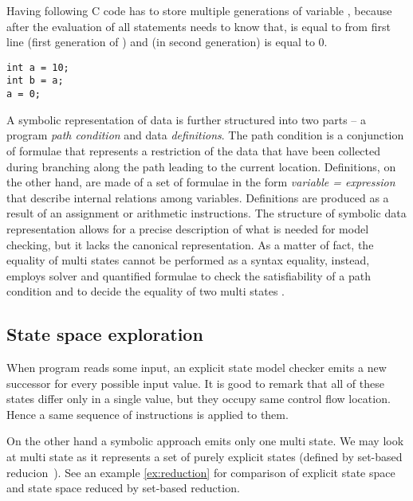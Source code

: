 
\begin{example}\label{ex:gen}
Having following C code \SymDIVINE has to store multiple generations of variable
, because after the evaluation of all statements \SymDIVINE needs to know
that,  is equal to  from first line (first generation of
) and  (in second generation) is equal to $0$.

\begin{verbatim}
int a = 10;
int b = a;
a = 0;
\end{verbatim}

\end{example}

A symbolic representation of data is further structured into two parts -- a
program \emph{path condition} and data \emph{definitions}. The path condition is a
conjunction of formulae that represents a restriction of the data that have been
collected during branching along the path leading to the current location.
Definitions, on the other hand, are made of a set of formulae in the form
\emph{variable = expression} that describe internal relations among variables.
Definitions are produced as a result of an assignment or arithmetic
instructions. The structure of symbolic data representation allows for a
precise description of what is needed for model checking, but it lacks the
canonical representation. As a matter of fact, the equality of multi states
cannot be performed as a syntax equality, instead, \SymDIVINE employs \SMT
solver and quantified formulae to check the satisfiability of a path condition
and to decide the equality of two multi states \cite{Mrazek16}.

\subsection{State space exploration}

When program reads some input, an explicit state model checker emits a
new successor for every possible input value. It is good to remark that all of
these states differ only in a single value, but they occupy same control flow
location. Hence a same sequence of instructions is applied to them.


On the other hand a symbolic approach emits only one multi state. We may look at
multi state as it represents a set of purely explicit states (defined by
set-based reducion~\cite{Havel14}). See an example \ref{ex:reduction} for comparison of
explicit state space and state space reduced by set-based reduction.

